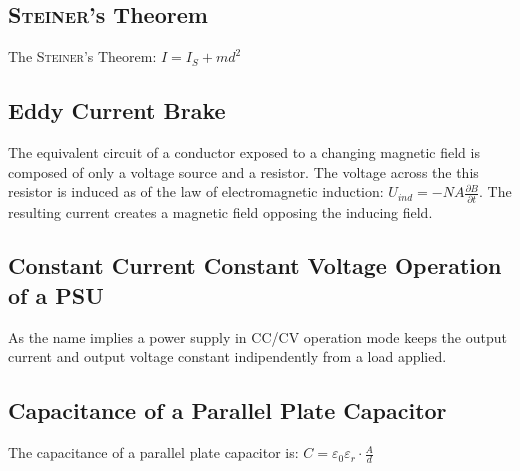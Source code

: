     \subsection*{\textsc{Steiner}'s Theorem}
        The \textsc{Steiner}'s Theorem: \(I = I_S + md^2\)
    \subsection*{Eddy Current Brake}
        The equivalent circuit of a conductor exposed to a changing magnetic field is composed of only a voltage source
        and a resistor. The voltage across the this resistor is induced as of the law of electromagnetic induction: \(U_{ind} = -NA\frac{\partial B}{\partial t}\).
        The resulting current creates a magnetic field opposing the inducing field.
    \subsection*{Constant Current Constant Voltage Operation of a PSU}
        As the name implies a power supply in CC/CV operation mode keeps the output current and output voltage constant
        indipendently from a load applied.
    \subsection*{Capacitance of a Parallel Plate Capacitor}
        The capacitance of a parallel plate capacitor is: \(C = \varepsilon_0 \varepsilon_r \cdot \frac{A}{d}\)
